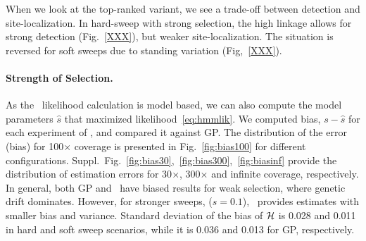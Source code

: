 When we look at the top-ranked variant, we see a trade-off between
detection and site-localization. In hard-sweep with strong selection, the high
linkage allows for strong detection (Fig.~\ref{XXX}), but weaker
site-localization. The situation is reversed for soft sweeps due to
standing variation (Fig,~\ref{XXX}).
 
\paragraph{Strength of Selection.}
As the \comale\ likelihood calculation is model based, we can also
compute the model parameters $\hat{s}$ that maximized
likelihood~\eqref{eq:hmmlik}. We computed bias, $s-\hat{s}$ for each
experiment of \comale, and compared it against GP. The distribution of
the error (bias) for 100$\times$ coverage is presented in
Fig.~\ref{fig:bias100} for different configurations.
Suppl.~Fig.~\ref{fig:bias30},~\ref{fig:bias300},~\ref{fig:biasinf}
provide the distribution of estimation errors for 30$\times$,
300$\times$ and infinite coverage, respectively.  In general, both GP
and \comale\ have biased results for weak selection, where genetic
drift dominates. However, for stronger sweeps, ($s=0.1$), \comale\
provides estimates with smaller bias and variance. Standard deviation
of the bias of ${\cal H}$ is 0.028 and 0.011 in hard and soft sweep
scenarios, while it is 0.036 and 0.013 for GP, respectively.



